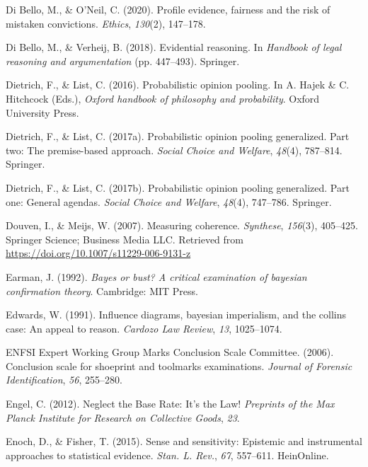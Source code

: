 \documentclass[11pt,dvipsnames,enabledeprecatedfontcommands]{scrartcl}
\begin{document}
\leavevmode\hypertarget{ref-DiBelloONeil2020}{}%
Di Bello, M., \& O'Neil, C. (2020). Profile evidence, fairness and the
risk of mistaken convictions. \emph{Ethics}, \emph{130}(2), 147--178.

\leavevmode\hypertarget{ref-di2018evidential}{}%
Di Bello, M., \& Verheij, B. (2018). Evidential reasoning. In
\emph{Handbook of legal reasoning and argumentation} (pp. 447--493).
Springer.

\leavevmode\hypertarget{ref-Dietrich2016Probabilistic}{}%
Dietrich, F., \& List, C. (2016). Probabilistic opinion pooling. In A.
Hajek \& C. Hitchcock (Eds.), \emph{Oxford handbook of philosophy and
probability}. Oxford University Press.

\leavevmode\hypertarget{ref-dietrich2017probabilistic2}{}%
Dietrich, F., \& List, C. (2017a). Probabilistic opinion pooling
generalized. Part two: The premise-based approach. \emph{Social Choice
and Welfare}, \emph{48}(4), 787--814. Springer.

\leavevmode\hypertarget{ref-dietrich2017probabilistic1}{}%
Dietrich, F., \& List, C. (2017b). Probabilistic opinion pooling
generalized. Part one: General agendas. \emph{Social Choice and
Welfare}, \emph{48}(4), 747--786. Springer.

\leavevmode\hypertarget{ref-Douven2007measuring}{}%
Douven, I., \& Meijs, W. (2007). Measuring coherence. \emph{Synthese},
\emph{156}(3), 405--425. Springer Science; Business Media LLC. Retrieved
from \url{https://doi.org/10.1007/s11229-006-9131-z}

\leavevmode\hypertarget{ref-earman1992bayes}{}%
Earman, J. (1992). \emph{Bayes or bust? A critical examination of
bayesian confirmation theory}. Cambridge: MIT Press.

\leavevmode\hypertarget{ref-Edwards1991Influence-diagr}{}%
Edwards, W. (1991). Influence diagrams, bayesian imperialism, and the
collins case: An appeal to reason. \emph{Cardozo Law Review}, \emph{13},
1025--1074.

\leavevmode\hypertarget{ref-ENFSI2006entropy}{}%
ENFSI Expert Working Group Marks Conclusion Scale Committee. (2006).
Conclusion scale for shoeprint and toolmarks examinations. \emph{Journal
of Forensic Identification}, \emph{56}, 255--280.

\leavevmode\hypertarget{ref-engel2012NeglectBaseRate}{}%
Engel, C. (2012). Neglect the Base Rate: It's the Law! \emph{Preprints
of the Max Planck Institute for Research on Collective Goods},
\emph{23}.

\leavevmode\hypertarget{ref-enoch2015sense}{}%
Enoch, D., \& Fisher, T. (2015). Sense and sensitivity: Epistemic and
instrumental approaches to statistical evidence. \emph{Stan. L. Rev.},
\emph{67}, 557--611. HeinOnline.
\end{document}
